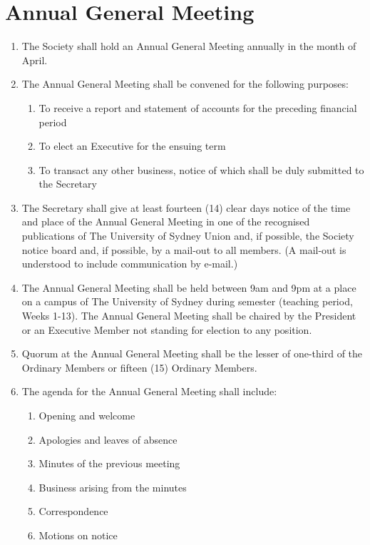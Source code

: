 \documentclass[11pt]{article}
\begin{document}
\section{Annual General Meeting}
\begin{enumerate}[\thesection .1]
    \item The Society shall hold an Annual General Meeting annually in the month of April.
    \item The Annual General Meeting shall be convened for the following purposes:
    \begin{enumerate}[\hspace{5mm}i)]
        \item To receive a report and statement of accounts for the preceding financial period
        \item To elect an Executive for the ensuing term
        \item To transact any other business, notice of which shall be duly submitted to the Secretary
    \end{enumerate}
    \item The Secretary shall give at least fourteen (14) clear days notice of the time and place of the Annual General Meeting in one of the recognised publications of The University of Sydney Union and, if possible, the Society notice board and, if possible, by a mail-out to all members. (A mail-out is understood to include communication by e-mail.)
    \item The Annual General Meeting shall be held between 9am and 9pm at a place on a campus of The University of Sydney during semester (teaching period, Weeks 1-13). The Annual General Meeting shall be chaired by the President or an Executive Member not standing for election to any position.
    \item Quorum at the Annual General Meeting shall be the lesser of one-third of the Ordinary Members or fifteen (15) Ordinary Members.
    \item The agenda for the Annual General Meeting shall include:
    \begin{enumerate}[\hspace{5mm}1.]
        \item Opening and welcome
    	\item Apologies and leaves of absence
    	\item Minutes of the previous meeting
    	\item Business arising from the minutes
    	\item Correspondence
    	\item Motions on notice

\end{enumerate}
\end{enumerate}
\end{document}
